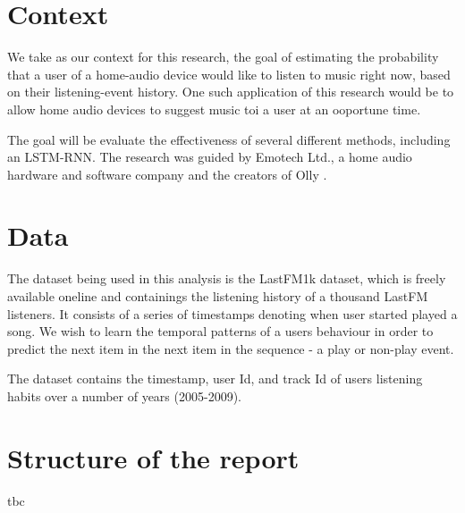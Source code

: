 \section{Context}

We take as our context for this research, the goal of estimating the probability that a user of a home-audio device would like to listen to music right now, based on their listening-event history. One such application of this research would be to allow home audio devices to suggest music toi a user at an ooportune time.

The goal will be evaluate the effectiveness of several different methods, including an LSTM-RNN. 
The research was guided by Emotech Ltd., a home audio hardware and software company and the creators of Olly \parencite{Olly}.

\section{Data}

The dataset being used in this analysis is the LastFM1k dataset, which is freely available oneline and containings the listening history of a thousand LastFM listeners. It consists of a series of timestamps denoting when user started played a song. We wish to learn the temporal patterns of a users behaviour in order to predict the next item in the next item in the sequence - a play or non-play event. 

The dataset contains the timestamp, user Id, and track Id of users listening habits over a number of years (2005-2009).

\section{Structure of the report}
tbc
